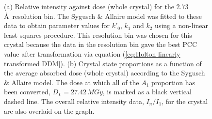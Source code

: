 \begin{figure}
\begin{subfigure}[b]{0.825\textwidth}
                \caption{}
                \label{figcrystalstates}
        \end{subfigure}
        \caption[Crystal states as predicted by the Sygusch and Alliare model applied to insulin data.]{(a) Relative intensity against dose (whole crystal) for the 2.73$\,$\AA\ resolution bin.
		The Sygusch \& Allaire model was fitted to these data to obtain parameter values for $k'_0$, $k_1$ and $k_2$ using a non-linear least squares procedure.
		This resolution bin was chosen for this crystal because the data in the resolution bin gave the best PCC value after transformation via equation (\ref{eq:Holton linearly transformed DDM}).
		(b) Crystal state proportions as a function of the average absorbed dose (whole crystal) according to the Sygusch \& Allaire model.
		The dose at which all of the $A_1$ proportion has been converted, $D_L = 27.42\,MGy$, is marked as a black vertical dashed line.
		The overall relative intensity data, $I_n/I_1$, for the crystal are also overlaid on the graph.}
        \label{figsyg}
\end{figure}
